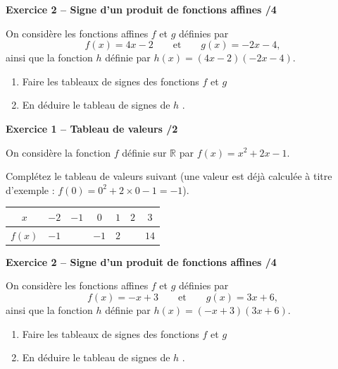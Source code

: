 \documentclass[10pt,a4paper]{article}
\begin{document}
\textbf{Exercice 2 -- Signe d'un produit de fonctions affines \hfill /4}

On considère les fonctions affines \(f\) et \(g\) définies par
\[
f(x)=4x-2 \qquad\text{et}\qquad g(x)=-2x-4,
\]
ainsi que la fonction \(h\) définie  par \(h(x)=(4x-2)(-2x-4)\).

\begin{enumerate}
\item Faire les tableaux de signes des fonctions \(f\) et \(g\)

\vspace{6cm}

\item En déduire le tableau de signes de \(h\) .

\vspace{4cm}

\end{enumerate}

\text{ }
\newpage


\textbf{Exercice 1 -- Tableau de valeurs \hfill /2}

On considère la fonction \(f\) définie sur \(\mathbb{R}\) par \(f(x)=x^2+2x-1\).

Complétez le tableau de valeurs suivant (une valeur est déjà calculée à titre d'exemple : \(f(0)=0^2+2\times 0-1=-1\)).

\begin{center}
    \renewcommand{\arraystretch}{1.5}
    \setlength{\tabcolsep}{0.25cm}
    \begin{tabular}{|*{7}{c|}}
    \hline
    \(x\) & \(-2\) & \(-1\) & \(0\) & \(1\) & \(2\) & \(3\) \\
    \hline
    \(f(x)\) & \(-1\) & & \(-1\) & \(2\) & & \(14\) \\
    \hline
    \end{tabular}
\end{center}

\textbf{Exercice 2 -- Signe d'un produit de fonctions affines \hfill /4}

On considère les fonctions affines \(f\) et \(g\) définies par
\[
f(x)=-x+3 \qquad\text{et}\qquad g(x)=3x+6,
\]
ainsi que la fonction \(h\) définie par \(h(x)=(-x+3)(3x+6)\).


\begin{enumerate}
\item Faire les tableaux de signes des fonctions \(f\) et \(g\)

\vspace{6cm}

\item En déduire le tableau de signes de \(h\) .

\vspace{4cm}

\end{enumerate}

\text{ }
\end{document}
